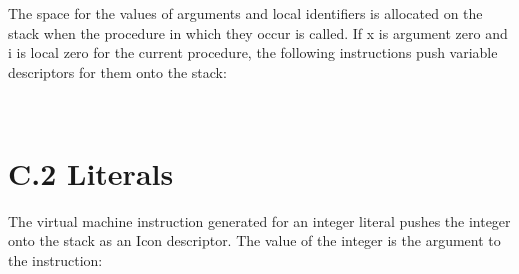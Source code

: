 The space for the values of arguments and local identifiers is
allocated on the stack when the procedure in which they occur is
called. If x is argument zero and i is local zero for the current
procedure, the following instructions push variable descriptors for
them onto the stack:

\begin{flushleft}
\tabletail{}
\tablelasttail{}
\begin{supertabular}{|m{1.9066598in}|m{2.75596in}|}

\end{supertabular}
\end{flushleft}

\bigskip

\begin{flushleft}
\tabletail{}
\tablelasttail{}
\begin{supertabular}{|m{1.9066598in}|m{2.75596in}|}

\end{supertabular}
\end{flushleft}


\section{C.2 Literals}

The virtual machine instruction generated for an integer literal
pushes the integer onto the stack as an Icon descriptor. The value of
the integer is the argument to the instruction:

\begin{flushleft}
\tabletail{}
\tablelasttail{}
\begin{supertabular}{|m{1.9066598in}|m{2.75596in}|}

\end{supertabular}
\end{flushleft}

